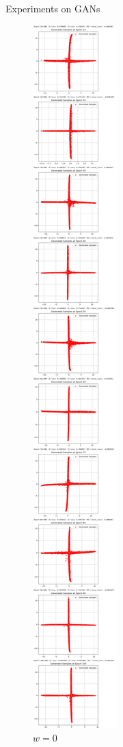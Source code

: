 \documentclass[final]{beamer}
\newlength{\colwidth}
\begin{document}
\begin{frame}[t]
\begin{columns}[t]
\begin{column}{\colwidth}
\begin{block}{Experiments on GANs}
\begin{figure}
\begin{minipage}{0.19\textwidth}
    \caption{$w=0$}
    \end{minipage}
    \begin{minipage}{0.19\textwidth}
    \centering
    \centering
    \includegraphics[width=1\linewidth]{gan_cross/Jietu20250101-004352@2x.png}

\end{minipage}
\end{figure}
\end{block}
\end{column}
\end{columns}
\end{frame}
\end{document}
